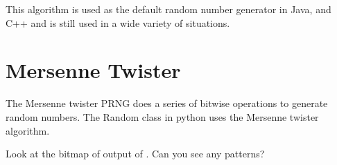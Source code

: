 This algorithm is used as the default random number generator in Java, and C++ and is still used in a wide variety of situations.

\section*{Mersenne Twister}

The Mersenne twister PRNG does a series of bitwise operations to generate random numbers.
The Random class in python uses the Mersenne twister algorithm. 

\begin{problem}
Look at the bitmap of output of .
Can you see any patterns?
\end{problem}

